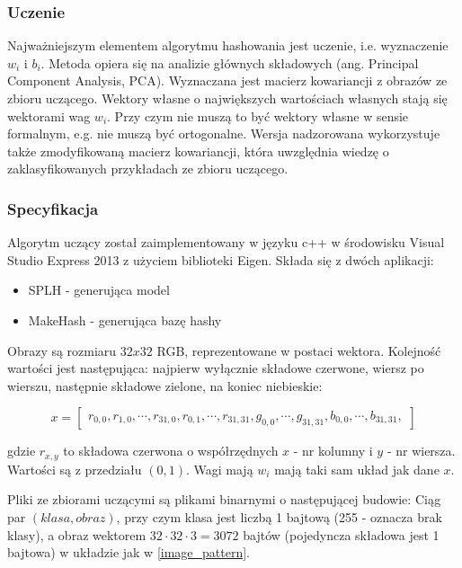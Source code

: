 \documentclass[10pt,a4paper]{article}
\begin{document}
\subsubsection{Uczenie}

Najważniejszym elementem algorytmu hashowania jest uczenie, i.e. wyznaczenie $w_i$ i $b_i$. Metoda opiera się na analizie głównych składowych (ang. Principal Component Analysis, PCA). Wyznaczana jest macierz kowariancji z obrazów ze zbioru uczącego. Wektory własne o największych wartościach własnych stają się wektorami wag $w_i$. Przy czym nie muszą to być wektory własne w sensie formalnym, e.g. nie muszą być ortogonalne. Wersja nadzorowana wykorzystuje także zmodyfikowaną macierz kowariancji, która uwzględnia wiedzę o zaklasyfikowanych przykładach ze zbioru uczącego.

\subsubsection{Specyfikacja}

Algorytm uczący został zaimplementowany w języku c++ w środowisku Visual Studio Express 2013 z użyciem biblioteki Eigen. Składa się z dwóch aplikacji:
\begin{itemize}
  \item SPLH - generująca model
  \item MakeHash - generująca bazę hashy
\end{itemize}

Obrazy są rozmiaru $32 x 32$ RGB, reprezentowane w postaci wektora. Kolejność wartości jest następująca: najpierw wyłącznie składowe czerwone, wiersz po wierszu, następnie składowe zielone, na koniec niebieskie:

\begin{equation} \label{image_pattern}
x = \left[
	\begin{array}{c}
		r_{0,0},
		r_{1,0},
		\cdots,
		r_{31,0},
		r_{0,1},
		\cdots,
		r_{31,31},
		g_{0,0},
		\cdots,
		g_{31,31},
		b_{0,0},
		\cdots,
		b_{31,31},
	\end{array}
\right]
\end{equation}

gdzie $r_{x,y}$ to składowa czerwona o współrzędnych $x$ - nr kolumny i $y$ - nr wiersza. Wartości są z przedziału $(0,1)$. Wagi mają $w_i$ mają taki sam układ jak dane $x$.

Pliki ze zbiorami uczącymi są plikami binarnymi o następującej budowie: Ciąg par $(klasa, obraz)$, przy czym klasa jest liczbą 1 bajtową (255 - oznacza brak klasy), a obraz wektorem $32 \cdot 32 \cdot 3 = 3 072$ bajtów (pojedyncza składowa jest 1 bajtowa) w układzie jak w \ref{image_pattern}.
\end{document}
